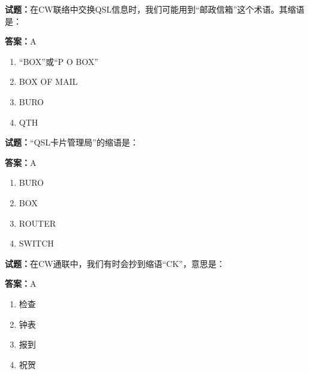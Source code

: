 \documentclass{ctexbook}
\begin{document}




\vspace{1em}

\textbf{试题：}在CW联络中交换QSL信息时，我们可能用到“邮政信箱”这个术语。其缩语是： 

\textbf{答案：}A 

\begin{enumerate}[leftmargin=3em]
  \item “BOX”或“P O BOX” 

  \item BOX OF MAIL 

  \item BURO 

  \item QTH 

\end{enumerate}






\vspace{1em}

\textbf{试题：}“QSL卡片管理局”的缩语是： 

\textbf{答案：}A 

\begin{enumerate}[leftmargin=3em]
  \item BURO 

  \item BOX 

  \item ROUTER 

  \item SWITCH 

\end{enumerate}





\vspace{1em}

\textbf{试题：}在CW通联中，我们有时会抄到缩语“CK”，意思是： 

\textbf{答案：}A 

\begin{enumerate}[leftmargin=3em]
  \item 检查 

  \item 钟表 

  \item 报到 

  \item 祝贺 

\end{enumerate}
\end{document}
